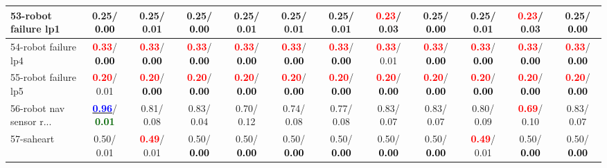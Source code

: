 \begin{table}[h]
\begin{center}
{\begin{tabular}{lc|c|c|c|c|c|c|c|c|c|c}
53-robot failure lp1 &   0.25/\textcolor{black}{\textbf{  0.00}} &   0.25/  0.01 &   0.25/\textcolor{black}{\textbf{  0.00}} &   0.25/  0.01 &   0.25/  0.01 &   0.25/  0.01 & \textcolor{red}{\textbf{  0.23}}/  0.03 &   0.25/\textcolor{black}{\textbf{  0.00}} &   0.25/  0.01 & \textcolor{red}{\textbf{  0.23}}/  0.03 &   0.25/\textcolor{black}{\textbf{  0.00}} \\ \hline
54-robot failure lp4 & \textcolor{red}{\textbf{  0.33}}/\textcolor{black}{\textbf{  0.00}} & \textcolor{red}{\textbf{  0.33}}/\textcolor{black}{\textbf{  0.00}} & \textcolor{red}{\textbf{  0.33}}/\textcolor{black}{\textbf{  0.00}} & \textcolor{red}{\textbf{  0.33}}/\textcolor{black}{\textbf{  0.00}} & \textcolor{red}{\textbf{  0.33}}/\textcolor{black}{\textbf{  0.00}} & \textcolor{red}{\textbf{  0.33}}/\textcolor{black}{\textbf{  0.00}} & \textcolor{red}{\textbf{  0.33}}/  0.01 & \textcolor{red}{\textbf{  0.33}}/\textcolor{black}{\textbf{  0.00}} & \textcolor{red}{\textbf{  0.33}}/\textcolor{black}{\textbf{  0.00}} & \textcolor{red}{\textbf{  0.33}}/\textcolor{black}{\textbf{  0.00}} & \textcolor{red}{\textbf{  0.33}}/\textcolor{black}{\textbf{  0.00}} \\
55-robot failure lp5 & \textcolor{red}{\textbf{  0.20}}/  0.01 & \textcolor{red}{\textbf{  0.20}}/\textcolor{black}{\textbf{  0.00}} & \textcolor{red}{\textbf{  0.20}}/\textcolor{black}{\textbf{  0.00}} & \textcolor{red}{\textbf{  0.20}}/\textcolor{black}{\textbf{  0.00}} & \textcolor{red}{\textbf{  0.20}}/\textcolor{black}{\textbf{  0.00}} & \textcolor{red}{\textbf{  0.20}}/\textcolor{black}{\textbf{  0.00}} & \textcolor{red}{\textbf{  0.20}}/\textcolor{black}{\textbf{  0.00}} & \textcolor{red}{\textbf{  0.20}}/\textcolor{black}{\textbf{  0.00}} & \textcolor{red}{\textbf{  0.20}}/\textcolor{black}{\textbf{  0.00}} & \textcolor{red}{\textbf{  0.20}}/\textcolor{black}{\textbf{  0.00}} & \textcolor{red}{\textbf{  0.20}}/\textcolor{black}{\textbf{  0.00}} \\
56-robot nav sensor r... & \underline{\textcolor{blue}{\textbf{  0.96}}}/\textcolor{darkgreen}{\textbf{  0.01}} &   0.81/  0.08 &   0.83/  0.04 &   0.70/  0.12 &   0.74/  0.08 &   0.77/  0.08 &   0.83/  0.07 &   0.83/  0.07 &   0.80/  0.09 & \textcolor{red}{\textbf{  0.69}}/  0.10 &   0.83/  0.07 \\
57-saheart &   0.50/  0.01 & \textcolor{red}{\textbf{  0.49}}/  0.01 &   0.50/\textcolor{black}{\textbf{  0.00}} &   0.50/\textcolor{black}{\textbf{  0.00}} &   0.50/\textcolor{black}{\textbf{  0.00}} &   0.50/\textcolor{black}{\textbf{  0.00}} &   0.50/\textcolor{black}{\textbf{  0.00}} &   0.50/\textcolor{black}{\textbf{  0.00}} & \textcolor{red}{\textbf{  0.49}}/  0.01 &   0.50/\textcolor{black}{\textbf{  0.00}} &   0.50/\textcolor{black}{\textbf{  0.00}} \\

\end{tabular}}
\end{center}
\end{table}
